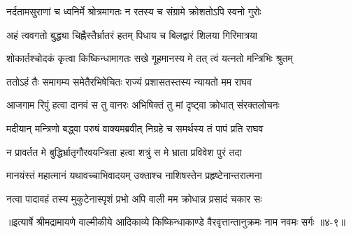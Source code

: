 \twolineshloka
{नर्दतामसुराणां च ध्वनिर्मे श्रोत्रमागतः}
{न रतस्य च संग्रामे क्रोशतोऽपि स्वनो गुरोः} %

\twolineshloka
{अहं त्ववगतो बुद्ध्या चिह्नैस्तैर्भ्रातरं हतम्}
{पिधाय च बिलद्वारं शिलया गिरिमात्रया} %

\twolineshloka
{शोकार्तश्चोदकं कृत्वा किष्किन्धामागतः सखे}
{गूहमानस्य मे तत् त्वं यत्नतो मन्त्रिभिः श्रुतम्} %

\twolineshloka
{ततोऽहं तैः समागम्य समेतैरभिषेचितः}
{राज्यं प्रशासतस्तस्य न्यायतो मम राघव} %

\twolineshloka
{आजगाम रिपुं हत्वा दानवं स तु वानरः}
{अभिषिक्तं तु मां दृष्ट्वा क्रोधात् संरक्तलोचनः} %

\twolineshloka
{मदीयान् मन्त्रिणो बद्ध्वा परुषं वाक्यमब्रवीत्}
{निग्रहे च समर्थस्य तं पापं प्रति राघव} %

\twolineshloka
{न प्रावर्तत मे बुद्धिर्भ्रातृगौरवयन्त्रिता}
{हत्वा शत्रुं स मे भ्राता प्रविवेश पुरं तदा} %

\twolineshloka
{मानयंस्तं महात्मानं यथावच्चाभिवादयम्}
{उक्ताश्च नाशिषस्तेन प्रहृष्टेनान्तरात्मना} %

\twolineshloka
{नत्वा पादावहं तस्य मुकुटेनास्पृशं प्रभो}
{अपि वाली मम क्रोधान्न प्रसादं चकार सः} %


॥इत्यार्षे श्रीमद्रामायणे वाल्मीकीये आदिकाव्ये किष्किन्धाकाण्डे वैरवृत्तान्तानुक्रमः नाम नवमः सर्गः ॥४-९॥
